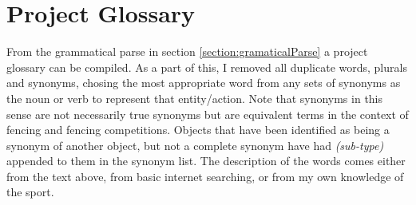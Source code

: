 \section{Project Glossary} \label{section:projectGlossary}
From the grammatical parse in section \vref{section:gramaticalParse} a project
glossary can be compiled. As a part of this, I removed all duplicate words, plurals and synonyms, chosing the most
appropriate word from any sets of synonyms as the noun or verb to represent
that entity/action. Note that synonyms in this sense are not necessarily true
synonyms but are equivalent terms in the context of fencing and fencing
competitions. Objects that have been identified as being a synonym of another
object, but not a complete synonym have had \textit{(sub-type)} appended to them
in the synonym list. The description of the words comes either from the text
above, from basic internet searching, or from my own knowledge of the sport.
